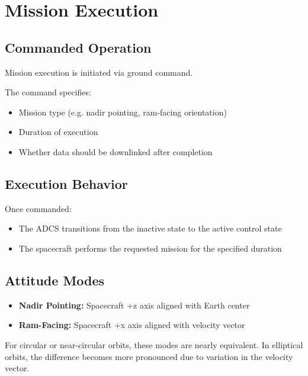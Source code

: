 \documentclass[letterpaper,11pt,oneside,english]{scrreprt}
\begin{document}
	\chapter{Mission Execution}
	
	\section{Commanded Operation}
	
	Mission execution is initiated via ground command.
	
	The command specifies:
	
	\begin{itemize}
		\item Mission type (e.g. nadir pointing, ram-facing orientation)
		\item Duration of execution
		\item Whether data should be downlinked after completion
	\end{itemize}
	
	\section{Execution Behavior}
	
	Once commanded:
	
	\begin{itemize}
		\item The ADCS transitions from the inactive state to the active control state
		\item The spacecraft performs the requested mission for the specified duration
	\end{itemize}
	
	\section{Attitude Modes}
	
	\begin{itemize}
		\item \textbf{Nadir Pointing:} Spacecraft +z axis aligned with Earth center
		\item \textbf{Ram-Facing:} Spacecraft +x axis aligned with velocity vector
	\end{itemize}
	
	For circular or near-circular orbits, these modes are nearly equivalent. In elliptical orbits, the difference becomes more pronounced due to variation in the velocity vector.
	
\end{document}
